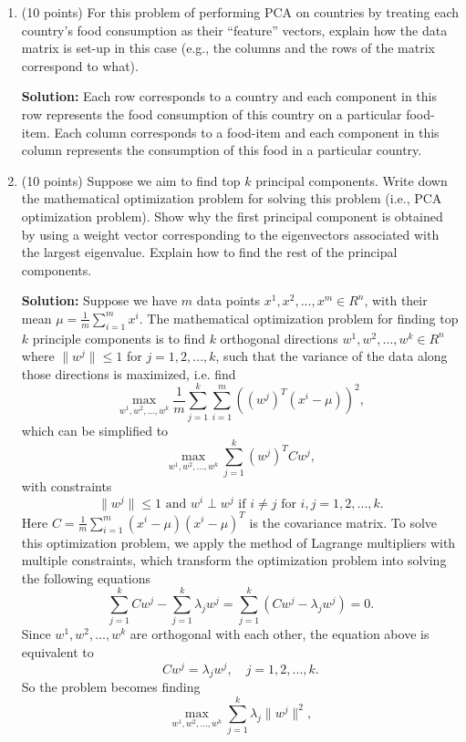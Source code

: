 \documentclass[twoside,12pt]{article}
\begin{document}
\begin{enumerate}

\item (10 points) For this problem of performing PCA on countries by treating each country's food consumption as their ``feature'' vectors, explain how the data matrix is set-up in this case (e.g., the columns and the rows of the matrix correspond to what). 
\begin{tcolorbox}
\textbf{Solution:} Each row corresponds to a country and each component in this row represents the food consumption of this country on a particular food-item. Each column corresponds to a food-item and each component in this column represents the consumption of this food in a particular country.
\end{tcolorbox}

\item (10 points) Suppose we aim to find top $k$ principal components. Write down the mathematical optimization problem for solving this problem (i.e., PCA optimization problem). Show why the first principal component is obtained by using a weight vector corresponding to the eigenvectors associated with the largest eigenvalue. Explain how to find the rest of the principal components. 
\begin{tcolorbox}
\textbf{Solution:} Suppose we have $m$ data points $x^1, x^2, ..., x^m \in R^n$, with their mean $\mu = \frac 1 m \sum_{i=1}^m x^i$. The mathematical optimization problem for finding top $k$ principle components is to find $k$ orthogonal directions $w^1, w^2, ..., w^k \in R^n$ where $\|w^j\| \leq 1$ for $j = 1, 2, ..., k$, such that the variance of the data along those directions is maximized, i.e. find
$$\max_{w^1, w^2, ..., w^k} \frac 1 m \sum_{j=1}^{k} \sum_{i=1}^m ((w^j)^T(x^i-\mu))^2,$$ which can be simplified to $$\max_{w^1, w^2, ..., w^k}  \sum_{j=1}^{k} (w^j)^TCw^j,$$ with constraints 
$$\|w^j\| \leq 1 \text{ and } w^i \perp w^j \text{ if } i \neq j \text{ for } i, j = 1, 2, ..., k.$$ Here $C = \frac 1 m \sum_{i=1}^m (x^i - \mu)(x^i-\mu)^T$ is the covariance matrix. 
To solve this optimization problem, we apply the method of Lagrange multipliers with multiple constraints, which transform the optimization problem into solving the following equations $$\sum_{j=1}^k Cw^j - \sum_{j=1}^k \lambda_jw^j = \sum_{j=1}^k (Cw^j - \lambda_jw^j) = 0.$$Since $w^1, w^2, ..., w^k$ are orthogonal with each other, the equation above is equivalent to $$Cw^j = \lambda_j w^j, \quad j = 1, 2, ..., k.$$ So the problem becomes finding $$\max_{w^1, w^2, ..., w^k}  \sum_{j=1}^{k} \lambda_j \|w^j\|^2,$$

\end{tcolorbox}
\end{enumerate}
\end{document}
